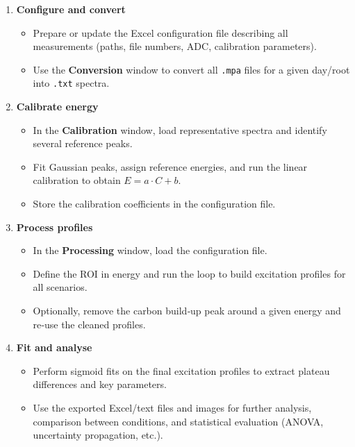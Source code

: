 \begin{enumerate}
\def\labelenumi{\arabic{enumi}.}
\tightlist
\item
  \textbf{Configure and convert}

  \begin{itemize}
  \tightlist
  \item
    Prepare or update the Excel configuration file describing all
    measurements (paths, file numbers, ADC, calibration parameters).\\
  \item
    Use the \textbf{Conversion} window to convert all \texttt{.mpa}
    files for a given day/root into \texttt{.txt} spectra.
  \end{itemize}
\item
  \textbf{Calibrate energy}

  \begin{itemize}
  \tightlist
  \item
    In the \textbf{Calibration} window, load representative spectra and
    identify several reference peaks.\\
  \item
    Fit Gaussian peaks, assign reference energies, and run the linear
    calibration to obtain \(E = a \cdot C + b\).\\
  \item
    Store the calibration coefficients in the configuration file.
  \end{itemize}
\item
  \textbf{Process profiles}

  \begin{itemize}
  \tightlist
  \item
    In the \textbf{Processing} window, load the configuration file.\\
  \item
    Define the ROI in energy and run the loop to build excitation
    profiles for all scenarios.\\
  \item
    Optionally, remove the carbon build‑up peak around a given energy
    and re‑use the cleaned profiles.
  \end{itemize}
\item
  \textbf{Fit and analyse}

  \begin{itemize}
  \tightlist
  \item
    Perform sigmoid fits on the final excitation profiles to extract
    plateau differences and key parameters.\\
  \item
    Use the exported Excel/text files and images for further analysis,
    comparison between conditions, and statistical evaluation (ANOVA,
    uncertainty propagation, etc.).
  \end{itemize}
\end{enumerate}

